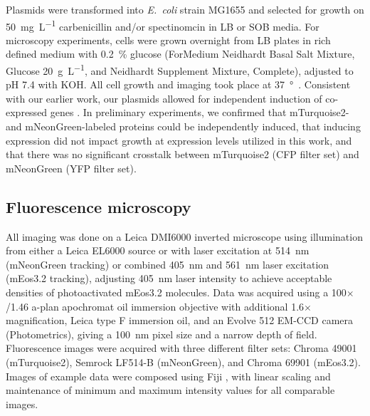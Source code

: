 \documentclass[twocolumn,pdflatex,sn-nature]{sn-jnl}%
\newcommand\ec{\textit{E.~coli}}
\begin{document}
Plasmids were transformed into \ec{} strain MG1655 and selected for growth on \qty{50}{\mg\per\L} carbenicillin and/or spectinomcin in LB or SOB media.
For microscopy experiments, cells were grown overnight from LB plates in rich defined medium \citep{neidhardtCultureMediumEnterobacteria1974} with \qty{0.2}{\percent} glucose (ForMedium Neidhardt Basal Salt Mixture, Glucose \qty{20}{\g\per\L}, and Neidhardt Supplement Mixture, Complete), adjusted to pH 7.4 with KOH.
All cell growth and imaging took place at \qty{37}{\degree\C}.
Consistent with our earlier work, our plasmids allowed for independent induction of co-expressed genes \citep{silvaPlasmidsIndependentlyTunable2019}.
In preliminary experiments, we confirmed that mTurquoise2- and mNeonGreen-labeled proteins could be independently induced, that inducing expression did not impact growth at expression levels utilized in this work, and that there was no significant crosstalk between mTurquoise2 (CFP filter set) and mNeonGreen (YFP filter set).

\subsection{Fluorescence microscopy}

All imaging was done on a Leica DMI6000 inverted microscope using illumination from either a Leica EL6000 source or with laser excitation at \qty{514}{\nm} (mNeonGreen tracking) or combined \qty{405}{\nm} and \qty{561}{\nm} laser excitation (mEos3.2 tracking), adjusting \qty{405}{\nm} laser intensity to achieve acceptable densities of photoactivated mEos3.2 molecules.
Data was acquired using a 100$\times$/1.46 a-plan apochromat oil immersion objective with additional 1.6$\times$ magnification, Leica type F immersion oil, and an Evolve 512 EM-CCD camera (Photometrics), giving a \qty{100}{\nm} pixel size and a narrow depth of field.
Fluorescence images were acquired with three different filter sets: Chroma 49001 (mTurquoise2), Semrock LF514-B (mNeonGreen), and Chroma 69901 (mEos3.2).
Images of example data were composed using Fiji \citep{schindelinFijiOpensourcePlatform2012}, with linear scaling and maintenance of minimum and maximum intensity values for all comparable images.
\end{document}
